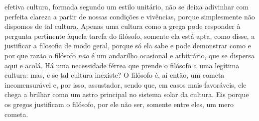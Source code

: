 efetiva cultura, formada segundo um estilo unitário, não se deixa
adivinhar com perfeita clareza a partir de nossas condições e
vivências, porque simplesmente não dispomos de tal cultura. Apenas uma
cultura como a grega pode responder à pergunta pertinente àquela tarefa
do filósofo, somente ela está apta, como disse, a justificar a
filosofia de modo geral, porque só ela sabe e pode demonstrar como e
por que razão o filósofo \textit{não} é um andarilho ocasional e
arbitrário, que se dispersa aqui e acolá. Há uma necessidade férrea que
prende o filósofo a uma legítima cultura: mas, e se tal cultura
inexiste? O filósofo é, aí então, um cometa incomensurável e, por isso,
assustador, sendo que, em casos mais favoráveis, ele chega a brilhar
como um astro principal no sistema solar da cultura. Eis porque os
gregos justificam o filósofo, por ele não ser, somente entre eles, um
mero cometa.

\sectionitem

